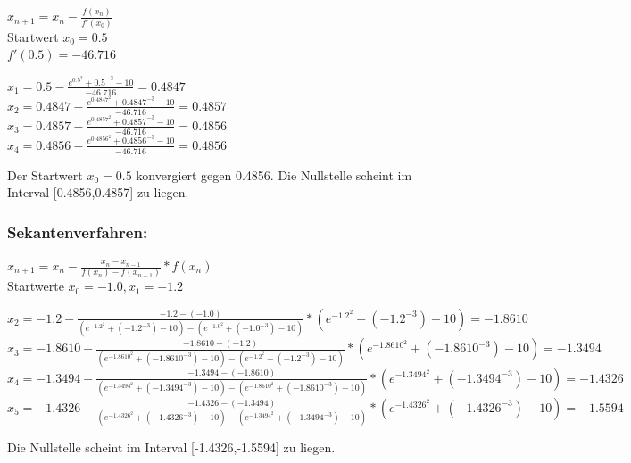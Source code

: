 \documentclass{article}
\begin{document}
\(x_{n+1} = x_n - \frac{f(x_n)}{f'(x_0)}\)\\
Startwert \(x_0 = 0.5\)\\
\(f'(0.5) = -46.716\)

\(x_1 = 0.5 - \frac{e^{0.5^2} + 0.5^{-3} - 10}{-46.716} =0.4847\)\\
\(x_2 = 0.4847 - \frac{e^{0.4847^2} + 0.4847^{-3} - 10}{-46.716} =0.4857\)\\
\(x_3 = 0.4857 - \frac{e^{0.4857^2} + 0.4857^{-3} - 10}{-46.716} =0.4856\)\\
\(x_4 = 0.4856 - \frac{e^{0.4856^2} + 0.4856^{-3} - 10}{-46.716} =0.4856\)

Der Startwert \(x_0 = 0.5\) konvergiert gegen 0.4856. Die Nullstelle scheint im Interval [0.4856,0.4857] zu liegen.

\subsubsection*{Sekantenverfahren:}
\(x_{n+1} = x_n - \frac{x_n - x_{n-1}}{f(x_n) - f(x_{n-1})} * f(x_n)\)\\
Startwerte \(x_0 = -1.0, x_1 = -1.2\)

\(x_2=-1.2-\frac{-1.2-(-1.0)}{(e^{-1.2^2}+(-1.2^{-3})- 10)-(e^{-1.0^2}+(-1.0^{-3})-10)}*(e^{-1.2^2}+(-1.2^{-3})-10)=-1.8610\)\\
\(x_3=-1.8610-\frac{-1.8610-(-1.2)}{(e^{-1.8610^2}+(-1.8610^{-3})- 10)-(e^{-1.2^2}+(-1.2^{-3})-10)}*(e^{-1.8610^2}+(-1.8610^{-3})-10)=-1.3494\)\\
\(x_4=-1.3494-\frac{-1.3494-(-1.8610)}{(e^{-1.3494^2}+(-1.3494^{-3})- 10)-(e^{-1.8610^2}+(-1.8610^{-3})-10)}*(e^{-1.3494^2}+(-1.3494^{-3})-10)=-1.4326\)\\
\(x_5=-1.4326-\frac{-1.4326-(-1.3494)}{(e^{-1.4326^2}+(-1.4326^{-3})- 10)-(e^{-1.3494^2}+(-1.3494^{-3})-10)}*(e^{-1.4326^2}+(-1.4326^{-3})-10)=-1.5594\)

Die Nullstelle scheint im Interval [-1.4326,-1.5594] zu liegen.
\end{document}
